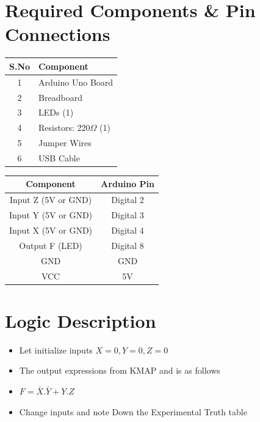 \documentclass[a4paper,12pt]{article}
\begin{document}
\section*{Required Components \& Pin Connections}
\begin{center}
\begin{minipage}{0.45\textwidth}
\begin{table}[H]
\centering
\begin{tabular}{|c|l|}
\hline
\textbf{S.No} & \textbf{Component} \\ \hline
1 & Arduino Uno Board \\
2 & Breadboard \\
3 & LEDs (1) \\
4 & Resistors: 220$\Omega$ (1) \\
5 & Jumper Wires \\
6 & USB Cable \\
\hline
\end{tabular}
\end{table}
\end{minipage}
\hspace{0.05\textwidth}
\begin{minipage}{0.45\textwidth}
\begin{table}[H]
\centering
\begin{tabular}{|c|c|}
\hline
\textbf{Component} & \textbf{Arduino Pin} \\ \hline
Input Z (5V or GND) & Digital 2 \\
Input Y (5V or GND) & Digital 3 \\
Input X (5V or GND) & Digital 4 \\
Output F (LED) & Digital 8 \\
GND & GND \\
VCC & 5V \\
\hline
\end{tabular}
\end{table}
\end{minipage}
\end{center}
\section*{Logic Description}
\begin{itemize}
        \item Let initialize inputs $X=0,Y=0,Z=0$
        \item The output expressions from KMAP and is as follows
	\item $F=\bar{X}.\bar{Y}+Y.Z$
	\item Change inputs and note Down the Experimental Truth table
\end{itemize}
\end{document}
